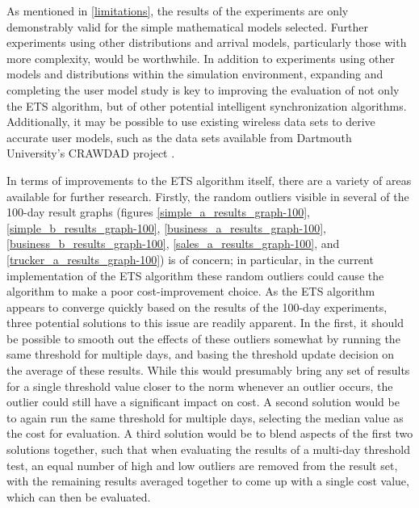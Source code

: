 As mentioned in \ref{limitations}, the results of the experiments are only demonstrably valid for the simple mathematical models selected.  Further experiments using other distributions and arrival models, particularly those with more complexity, would be worthwhile.  In addition to experiments using other models and distributions within the simulation environment, expanding and completing the user model study is key to improving the evaluation of not only the ETS algorithm, but of other potential intelligent synchronization algorithms.  Additionally, it may be possible to use existing wireless data sets to derive accurate user models, such as the data sets available from Dartmouth University's CRAWDAD project \cite{crawdad, 511359, 1160109}.

In terms of improvements to the ETS algorithm itself, there are a variety of areas available for further research.  Firstly, the random outliers visible in several of the 100-day result graphs (figures \ref{simple_a_results_graph-100}, \ref{simple_b_results_graph-100}, \ref{business_a_results_graph-100}, \ref{business_b_results_graph-100}, \ref{sales_a_results_graph-100}, and \ref{trucker_a_results_graph-100}) is of concern; in particular, in the current implementation of the ETS algorithm these random outliers could cause the algorithm to make a poor cost-improvement choice.  As the ETS algorithm appears to converge quickly based on the results of the 100-day experiments, three potential solutions to this issue are readily apparent.  In the first, it should be possible to smooth out the effects of these outliers somewhat by running the same threshold for multiple days, and basing the threshold update decision on the average of these results.  While this would presumably bring any set of results for a single threshold value closer to the norm whenever an outlier occurs, the outlier could still have a significant impact on cost.  A second solution would be to again run the same threshold for multiple days, selecting the median value as the cost for evaluation.  A third solution would be to blend aspects of the first two solutions together, such that when evaluating the results of a multi-day threshold test, an equal number of high and low outliers are removed from the result set, with the remaining results averaged together to come up with a single cost value, which can then be evaluated.

